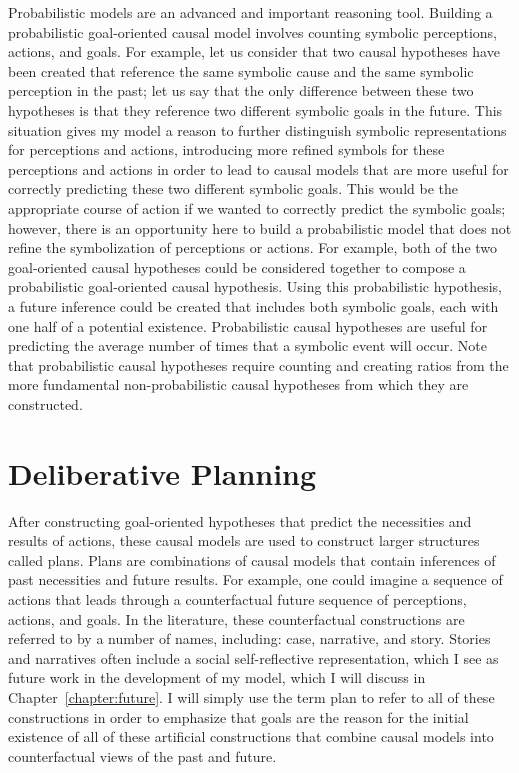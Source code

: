 Probabilistic models are an advanced and important reasoning tool.
Building a probabilistic goal-oriented causal model involves counting
symbolic perceptions, actions, and goals.  For example, let us
consider that two causal hypotheses have been created that reference
the same symbolic cause and the same symbolic perception in the past;
let us say that the only difference between these two hypotheses is
that they reference two different symbolic goals in the future.  This
situation gives my model a reason to further distinguish symbolic
representations for perceptions and actions, introducing more refined
symbols for these perceptions and actions in order to lead to causal
models that are more useful for correctly predicting these two
different symbolic goals.  This would be the appropriate course of
action if we wanted to correctly predict the symbolic goals; however,
there is an opportunity here to build a probabilistic model that does
not refine the symbolization of perceptions or actions.  For example,
both of the two goal-oriented causal hypotheses could be considered
together to compose a probabilistic goal-oriented causal hypothesis.
Using this probabilistic hypothesis, a future inference could be
created that includes both symbolic goals, each with one half of a
potential existence.  Probabilistic causal hypotheses are useful for
predicting the average number of times that a symbolic event will
occur.  Note that probabilistic causal hypotheses require counting and
creating ratios from the more fundamental non-probabilistic causal
hypotheses from which they are constructed.

\section{Deliberative Planning}

After constructing goal-oriented hypotheses that predict the
necessities and results of actions, these causal models are used to
construct larger structures called plans.  Plans are combinations of
causal models that contain inferences of past necessities and future
results.  For example, one could imagine a sequence of actions that
leads through a counterfactual future sequence of perceptions,
actions, and goals.  In the literature, these counterfactual
constructions are referred to by a number of names, including: case,
narrative, and story.  Stories and narratives often include a social
self-reflective representation, which I see as future work in the
development of my model, which I will discuss in
Chapter~\ref{chapter:future}.  I will simply use the term plan to
refer to all of these constructions in order to emphasize that goals
are the reason for the initial existence of all of these artificial
constructions that combine causal models into counterfactual views of
the past and future.

